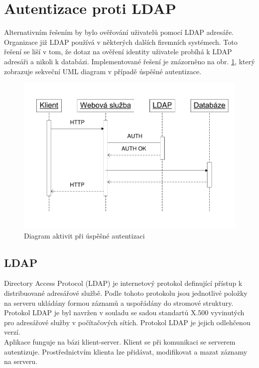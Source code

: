 \documentclass{diplomka}
\begin{document}
\section{Autentizace proti LDAP}
Alternativním řešením by bylo ověřování uživatelů pomocí LDAP adresáře. Organizace již LDAP používá v některých dalších firemních systémech. Toto řešení se liší v tom, že dotaz na ověření identity uživatele probíhá k LDAP adresáři a nikoli k databázi. Implementované řešení je znázorněno na obr. \ref{obr:authldap}, který zobrazuje sekveční UML diagram v případě úspěšné autentizace.
\begin{figure}[H]
  \centering
  \includegraphics[scale=0.8]{visio/auth_ldap.pdf}
\caption{Diagram aktivit při úspěšné autentizaci}
\label{obr:authldap}
\end{figure}
\subsection{LDAP}
 Directory Access Protocol (LDAP) je internetový protokol definující přístup k distribuované adresářové službě. Podle tohoto protokolu jsou jednotlivé položky na serveru ukládány formou záznamů a uspořádány do stromové struktury. Protokol LDAP je byl navržen v souladu  se sadou standartů X.500 vyvinutých pro adresářové služby v počítačových sítích. Protokol LDAP je jejich odlehčenou verzí.\\ \indent
Aplikace funguje na bázi klient-server. Klient se při komunikaci se serverem autentizuje. Prostřednictvím klienta lze přidávat, modifikovat a mazat záznamy na serveru.
\end{document}
